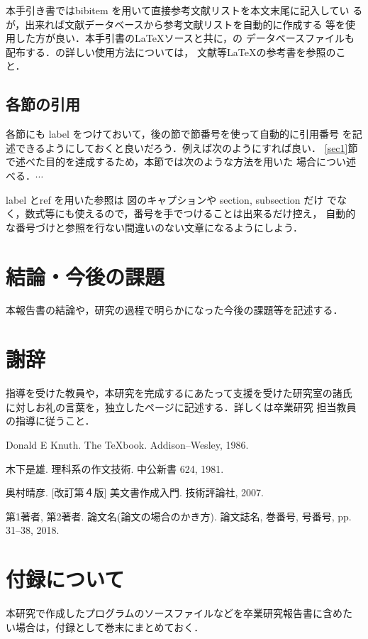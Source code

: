\documentclass{jsarticle}
\begin{document}
本手引き書ではbibitem を用いて直接参考文献リストを本文末尾に記入してい
るが，出来れば文献データベースから参考文献リストを自動的に作成する
\BibTeX 等を使用した方が良い．本手引書の\LaTeX ソースと共に，\BibTeX の
データベースファイルも配布する．\BibTeX の詳しい使用方法については，
文献\cite{okumura}等\LaTeX の参考書を参照のこと．

\subsection{各節の引用}
各節にも label をつけておいて，後の節で節番号を使って自動的に引用番号
を記述できるようにしておくと良いだろう．例えば次のようにすれば良い．
\ref{sec1}節で述べた目的を達成するため，本節では次のような方法を用いた
場合につい述べる．$\cdots$

label とref を用いた参照は 図のキャプションや section, subsection だけ
でなく，数式等にも使えるので，番号を手でつけることは出来るだけ控え，
自動的な番号づけと参照を行ない間違いのない文章になるようにしよう．



\section{結論・今後の課題}
本報告書の結論や，研究の過程で明らかになった今後の課題等を記述する．

\newpage
\section*{謝辞}
指導を受けた教員や，本研究を完成するにあたって支援を受けた研究室の諸氏
に対しお礼の言葉を，独立したページに記述する．詳しくは卒業研究
担当教員の指導に従うこと．


\newpage


\begin{thebibliography}{1}
Donald E Knuth. The \TeX book. Addison--Wesley, 1986.

木下是雄. 理科系の作文技術. 中公新書 624, 1981.


奥村晴彦. [改訂第４版] \LaTeXe 美文書作成入門. 技術評論社, 2007.

第1著者, 第2著者.
\newblock 論文名(論文の場合のかき方).
\newblock 論文誌名, 巻番号, 号番号, pp. 31--38, 2018.


\end{thebibliography}


%



\newpage
\appendix
\section{付録について}
本研究で作成したプログラムのソースファイルなどを卒業研究報告書に含めた
い場合は，付録として巻末にまとめておく．
\end{document}
